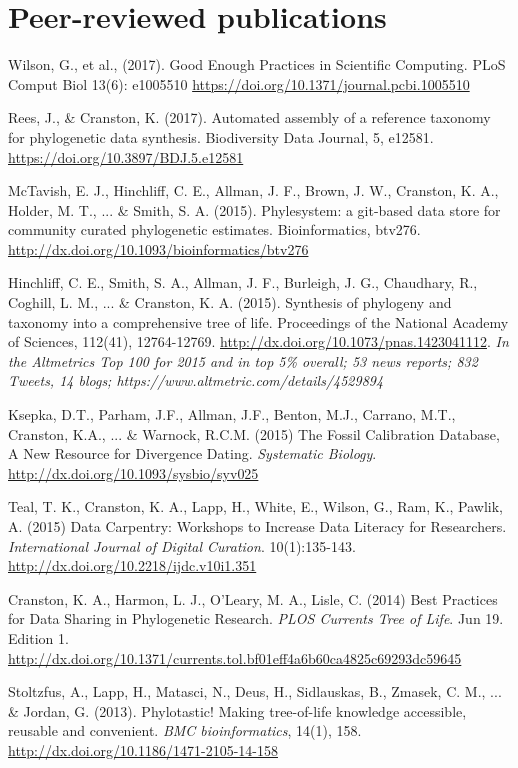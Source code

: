 \documentclass[10pt]{article}
\begin{document}
\section*{Peer-reviewed publications}

Wilson, G., et al., (2017). Good Enough Practices in Scientific Computing. PLoS Comput Biol 13(6): e1005510 \url{https://doi.org/10.1371/journal.pcbi.1005510}

Rees, J., \& Cranston, K. (2017). Automated assembly of a reference taxonomy for phylogenetic data synthesis. Biodiversity Data Journal, 5, e12581. \url{https://doi.org/10.3897/BDJ.5.e12581}

McTavish, E. J., Hinchliff, C. E., Allman, J. F., Brown, J. W., Cranston, K. A., Holder, M. T., ... \& Smith, S. A. (2015). Phylesystem: a git-based data store for community curated phylogenetic estimates. Bioinformatics, btv276. \url{http://dx.doi.org/10.1093/bioinformatics/btv276} 

Hinchliff, C. E., Smith, S. A., Allman, J. F., Burleigh, J. G., Chaudhary, R., Coghill, L. M., ... \& Cranston, K. A. (2015). Synthesis of phylogeny and taxonomy into a comprehensive tree of life. Proceedings of the National Academy of Sciences, 112(41), 12764-12769. \url{http://dx.doi.org/10.1073/pnas.1423041112}. \textit{In the Altmetrics Top 100 for 2015 and in top 5\% overall; 53 news reports; 832 Tweets, 14 blogs; https://www.altmetric.com/details/4529894}

Ksepka, D.T., Parham, J.F., Allman, J.F., Benton, M.J., Carrano, M.T., Cranston, K.A., ... \& Warnock, R.C.M. (2015) The Fossil Calibration Database, A New Resource for Divergence Dating. \textit{Systematic Biology}. \url{http://dx.doi.org/10.1093/sysbio/syv025}

Teal, T. K., Cranston, K. A., Lapp, H., White, E., Wilson, G., Ram, K., Pawlik, A. (2015) Data Carpentry: Workshops to Increase Data Literacy for Researchers. \textit{International Journal of Digital Curation}. 10(1):135-143. \url{http://dx.doi.org/10.2218/ijdc.v10i1.351}
 
Cranston, K. A., Harmon, L. J., O'Leary, M. A., Lisle, C. (2014) Best Practices for Data Sharing in Phylogenetic Research. \textit{PLOS Currents Tree of Life}. Jun 19. Edition 1. \url{http://dx.doi.org/10.1371/currents.tol.bf01eff4a6b60ca4825c69293dc59645} 

Stoltzfus, A., Lapp, H., Matasci, N., Deus, H., Sidlauskas, B., Zmasek, C. M., ... \& Jordan, G. (2013). Phylotastic! Making tree-of-life knowledge accessible, reusable and convenient. \textit{BMC bioinformatics}, 14(1), 158. \url{http://dx.doi.org/10.1186/1471-2105-14-158} 
\end{document}
